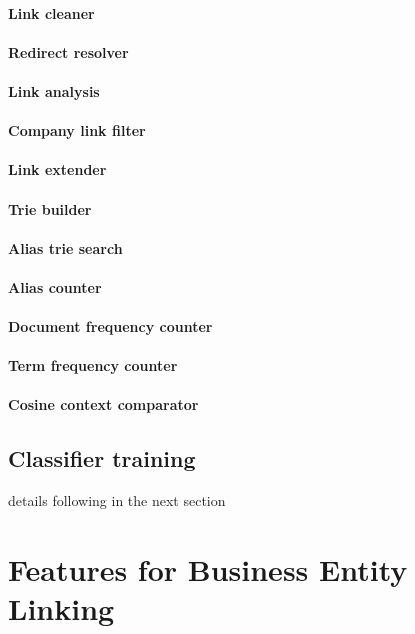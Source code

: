 \documentclass[
        a4paper,     %
        titlepage,   %
        twoside,     %
        parskip      %
        ]{scrartcl} %
\begin{document}
\paragraph{Link cleaner}
\paragraph{Redirect resolver}
\paragraph{Link analysis}
\paragraph{Company link filter}
\paragraph{Link extender}
\paragraph{Trie builder}
\paragraph{Alias trie search}
\paragraph{Alias counter}
\paragraph{Document frequency counter}
\paragraph{Term frequency counter}
\paragraph{Cosine context comparator}

\subsection{Classifier training}
details following in the next section


\section{Features for Business Entity Linking}
\end{document}
